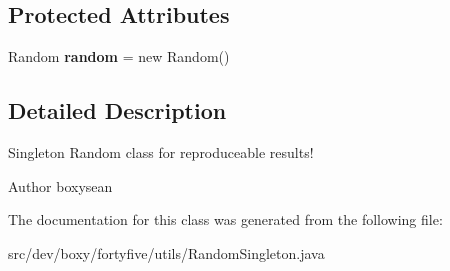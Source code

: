 \subsection*{Protected Attributes}
\begin{DoxyCompactItemize}
\item 
\hypertarget{classdev_1_1boxy_1_1fortyfive_1_1utils_1_1_random_singleton_a7698d26f3786f1844e4f61a8bc382777}{
Random {\bfseries random} = new Random()}
\label{d1/d11/classdev_1_1boxy_1_1fortyfive_1_1utils_1_1_random_singleton_a7698d26f3786f1844e4f61a8bc382777}

\end{DoxyCompactItemize}


\subsection{Detailed Description}
Singleton Random class for reproduceable results! \begin{DoxyAuthor}{Author}
boxysean 
\end{DoxyAuthor}


The documentation for this class was generated from the following file:\begin{DoxyCompactItemize}
\item 
src/dev/boxy/fortyfive/utils/RandomSingleton.java\end{DoxyCompactItemize}
